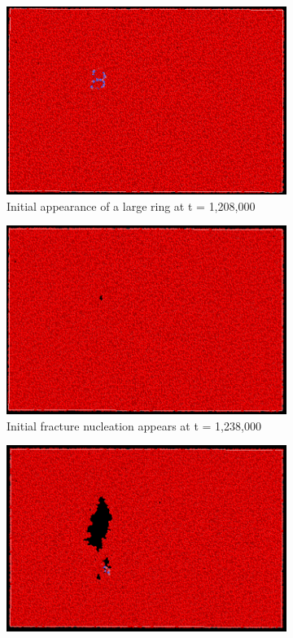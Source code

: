     \begin{figure}
    \begin{subfigure}{.5\textwidth}
      \centering
      \includegraphics[width=.8\linewidth]{images/fp1_ini_ring20_t=604.png}
      \caption{Initial appearance of a large ring at t = 1,208,000}
      \label{fig:loopfig1}
    \end{subfigure}%
    \begin{subfigure}{.5\textwidth}
      \centering
      \includegraphics[width=.8\linewidth]{images/fp1_ini_nucle_t=619.png}
      \caption{Initial fracture nucleation appears at t = 1,238,000}
      \label{fig:loopfig2}
    \end{subfigure}
    \begin{subfigure}{.5\textwidth}
      \centering
      \includegraphics[width=.8\linewidth]{images/fp1_propa.png}

\end{subfigure}
\end{figure}
